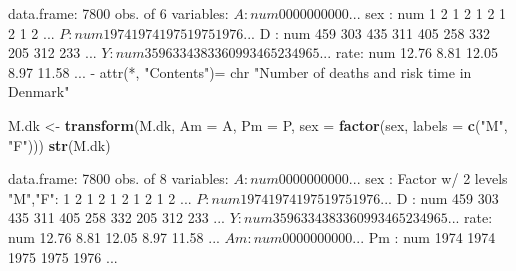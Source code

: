 \documentclass[
]{book}
\newenvironment{Shaded}{\begin{snugshade}}{\end{snugshade}}
\newcommand{\AttributeTok}[1]{\textcolor[rgb]{0.13,0.29,0.53}{#1}}
\newcommand{\CommentTok}[1]{\textcolor[rgb]{0.56,0.35,0.01}{\textit{#1}}}
\newcommand{\FloatTok}[1]{\textcolor[rgb]{0.00,0.00,0.81}{#1}}
\newcommand{\FunctionTok}[1]{\textcolor[rgb]{0.13,0.29,0.53}{\textbf{#1}}}
\newcommand{\NormalTok}[1]{#1}
\newcommand{\OtherTok}[1]{\textcolor[rgb]{0.56,0.35,0.01}{#1}}
\newcommand{\SpecialCharTok}[1]{\textcolor[rgb]{0.81,0.36,0.00}{\textbf{#1}}}
\newcommand{\StringTok}[1]{\textcolor[rgb]{0.31,0.60,0.02}{#1}}
\begin{document}
\begin{enumerate}
\begin{Shaded}
\end{Shaded}

\begin{Shaded}
\begin{Highlighting}[]
\NormalTok{\textquotesingle{}data.frame\textquotesingle{}:   7800 obs. of  6 variables:}
\NormalTok{ $ A   : num  0 0 0 0 0 0 0 0 0 0 ...}
\NormalTok{ $ sex : num  1 2 1 2 1 2 1 2 1 2 ...}
\NormalTok{ $ P   : num  1974 1974 1975 1975 1976 ...}
\NormalTok{ $ D   : num  459 303 435 311 405 258 332 205 312 233 ...}
\NormalTok{ $ Y   : num  35963 34383 36099 34652 34965 ...}
\NormalTok{ $ rate: num  12.76 8.81 12.05 8.97 11.58 ...}
\NormalTok{ {-} attr(*, "Contents")= chr "Number of deaths and risk time in Denmark"}
\end{Highlighting}
\end{Shaded}

\begin{Shaded}
\begin{Highlighting}[]
\NormalTok{M.dk }\OtherTok{\textless{}{-}} \FunctionTok{transform}\NormalTok{(M.dk,}
                  \AttributeTok{Am =}\NormalTok{ A,}
                  \AttributeTok{Pm =}\NormalTok{ P,}
                 \AttributeTok{sex =} \FunctionTok{factor}\NormalTok{(sex, }\AttributeTok{labels =} \FunctionTok{c}\NormalTok{(}\StringTok{"M"}\NormalTok{, }\StringTok{"F"}\NormalTok{)))}
\FunctionTok{str}\NormalTok{(M.dk)}
\end{Highlighting}
\end{Shaded}

\begin{Shaded}
\begin{Highlighting}[]
\NormalTok{\textquotesingle{}data.frame\textquotesingle{}:   7800 obs. of  8 variables:}
\NormalTok{ $ A   : num  0 0 0 0 0 0 0 0 0 0 ...}
\NormalTok{ $ sex : Factor w/ 2 levels "M","F": 1 2 1 2 1 2 1 2 1 2 ...}
\NormalTok{ $ P   : num  1974 1974 1975 1975 1976 ...}
\NormalTok{ $ D   : num  459 303 435 311 405 258 332 205 312 233 ...}
\NormalTok{ $ Y   : num  35963 34383 36099 34652 34965 ...}
\NormalTok{ $ rate: num  12.76 8.81 12.05 8.97 11.58 ...}
\NormalTok{ $ Am  : num  0 0 0 0 0 0 0 0 0 0 ...}
\NormalTok{ $ Pm  : num  1974 1974 1975 1975 1976 ...}
\end{Highlighting}
\end{Shaded}


\end{enumerate}
\end{document}

